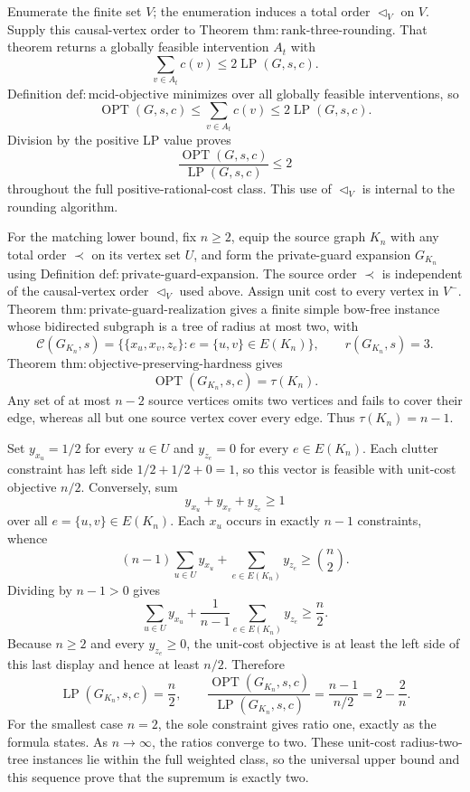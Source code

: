 Enumerate the finite set \(V\); the enumeration induces a total order \(\triangleleft_V\) on \(V\).  Supply this causal-vertex order to Theorem \(\mathrm{thm{:}rank\mbox{-}three\mbox{-}rounding}\).  That theorem returns a globally feasible intervention \(A_t\) with
\[
 \sum_{v\in A_t}c(v)\leq2\operatorname{LP}(G,s,c).
\]
Definition \(\mathrm{def{:}mcid\mbox{-}objective}\) minimizes over all globally feasible interventions, so
\[
 \operatorname{OPT}(G,s,c)
 \leq\sum_{v\in A_t}c(v)
 \leq2\operatorname{LP}(G,s,c).
\]
Division by the positive LP value proves
\[
 \frac{\operatorname{OPT}(G,s,c)}{\operatorname{LP}(G,s,c)}\leq2
\]
throughout the full positive-rational-cost class.  This use of \(\triangleleft_V\) is internal to the rounding algorithm.

For the matching lower bound, fix \(n\geq2\), equip the source graph \(K_n\) with any total order \(\prec\) on its vertex set \(U\), and form the private-guard expansion \(G_{K_n}\) using Definition \(\mathrm{def{:}private\mbox{-}guard\mbox{-}expansion}\).  The source order \(\prec\) is independent of the causal-vertex order \(\triangleleft_V\) used above.  Assign unit cost to every vertex in \(V^{-}\).  Theorem \(\mathrm{thm{:}private\mbox{-}guard\mbox{-}realization}\) gives a finite simple bow-free instance whose bidirected subgraph is a tree of radius at most two, with
\[
 \mathcal C(G_{K_n},s)
 =\bigl\{\{x_u,x_v,z_e\}:e=\{u,v\}\in E(K_n)\bigr\},
 \qquad r(G_{K_n},s)=3.
\]
Theorem \(\mathrm{thm{:}objective\mbox{-}preserving\mbox{-}hardness}\) gives
\[
 \operatorname{OPT}(G_{K_n},s,c)=\tau(K_n).
\]
Any set of at most \(n-2\) source vertices omits two vertices and fails to cover their edge, whereas all but one source vertex cover every edge.  Thus \(\tau(K_n)=n-1\).

Set \(y_{x_u}=1/2\) for every \(u\in U\) and \(y_{z_e}=0\) for every \(e\in E(K_n)\).  Each clutter constraint has left side \(1/2+1/2+0=1\), so this vector is feasible with unit-cost objective \(n/2\).  Conversely, sum
\[
 y_{x_u}+y_{x_v}+y_{z_e}\geq1
\]
over all \(e=\{u,v\}\in E(K_n)\).  Each \(x_u\) occurs in exactly \(n-1\) constraints, whence
\[
 (n-1)\sum_{u\in U}y_{x_u}
 +\sum_{e\in E(K_n)}y_{z_e}
 \geq\binom n2.
\]
Dividing by \(n-1>0\) gives
\[
 \sum_{u\in U}y_{x_u}
 +\frac1{n-1}\sum_{e\in E(K_n)}y_{z_e}
 \geq\frac n2.
\]
Because \(n\geq2\) and every \(y_{z_e}\geq0\), the unit-cost objective is at least the left side of this last display and hence at least \(n/2\).  Therefore
\[
 \operatorname{LP}(G_{K_n},s,c)=\frac n2,
 \qquad
 \frac{\operatorname{OPT}(G_{K_n},s,c)}{\operatorname{LP}(G_{K_n},s,c)}
 =\frac{n-1}{n/2}=2-\frac2n.
\]
For the smallest case \(n=2\), the sole constraint gives ratio one, exactly as the formula states.  As \(n\to\infty\), the ratios converge to two.  These unit-cost radius-two-tree instances lie within the full weighted class, so the universal upper bound and this sequence prove that the supremum is exactly two.

